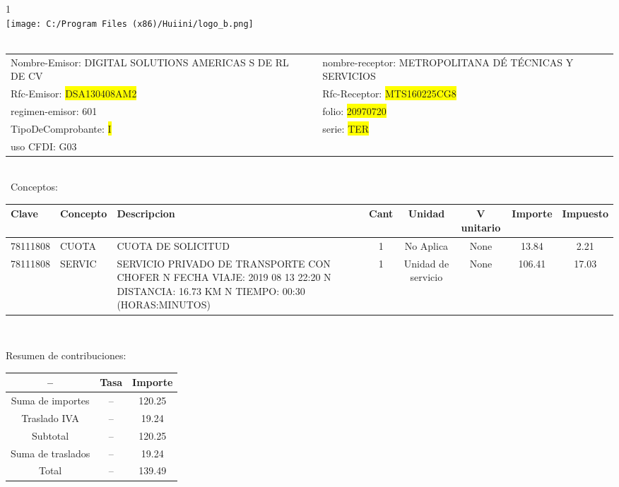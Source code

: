 \documentclass{article}
\begin{document}
\hspace{18cm} 1\\
\texttt{[image: C:/Program Files (x86)/Huiini/logo\_b.png]}
\bigskip\\\
\begin{tabular}{p{11cm}p{1cm}p{8cm}}

Nombre-Emisor: DIGITAL SOLUTIONS AMERICAS S DE RL DE CV && nombre-receptor: METROPOLITANA DÉ TÉCNICAS Y SERVICIOS\\

Rfc-Emisor: \colorbox{yellow}{ DSA130408AM2 } & & Rfc-Receptor: \colorbox{yellow}{ MTS160225CG8 }\\

regimen-emisor: 601 & & folio: \colorbox{yellow}{ 20970720 }\\

TipoDeComprobante: \colorbox{yellow}{ I } & & serie: \colorbox{yellow}{ TER }\\

uso CFDI: G03\\



\end{tabular}
\bigskip\bigskip\bigskip\\\
Conceptos:\\
\begin{tabular}{|p{1.5cm}|p{3.6cm}|p{3.6cm}|c|c|c|c|c|}
\hline
Clave & Concepto & Descripcion & Cant & Unidad & V unitario & Importe & Impuesto \\
\hline

78111808 & CUOTA  & CUOTA DE SOLICITUD & 1 & No Aplica & None & 13.84 &  2.21 \\
\hline

78111808 & SERVIC & SERVICIO PRIVADO DE TRANSPORTE CON CHOFER  N FECHA VIAJE: 2019 08 13 22:20  N DISTANCIA: 16.73 KM  N TIEMPO: 00:30 (HORAS:MINUTOS) & 1 & Unidad de servicio & None & 106.41 &  17.03 \\
\hline

\end{tabular}\\
\bigskip
\begin{center}
Resumen de contribuciones:\\
\bigskip
\begin{tabular}{|c|c|c|}
\hline
 -- & Tasa & Importe\\
\hline

Suma de importes & -- & 120.25 \\
\hline

Traslado IVA & -- & 19.24 \\
\hline

Subtotal  & -- & 120.25 \\
\hline

Suma de traslados & -- & 19.24 \\
\hline

Total  & -- & 139.49 \\
\hline

\end{tabular}
\end{center}
\end{document}
